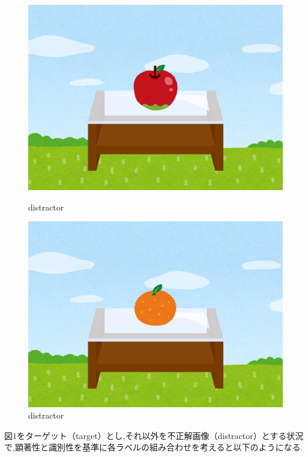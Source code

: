 \documentclass[a4paper,11pt]{jreport}
\begin{document}
\begin{figure}[H]
\begin{minipage}{0.23\textwidth}
    \includegraphics[width=\linewidth]{figures/label_image3.png}
    \caption{distractor}
    \label{fig:image_3}
  \end{minipage}
  \hfill
  \begin{minipage}{0.23\textwidth}
    \centering
    \includegraphics[width=\linewidth]{figures/label_image4.png}
    \caption{distractor}
    \label{fig:image_4}
  \end{minipage}
\end{figure}

図1をターゲット（target）とし,それ以外を不正解画像（distractor）とする状況で,顕著性と識別性を基準に各ラベルの組み合わせを考えると以下のようになる.
\end{document}
